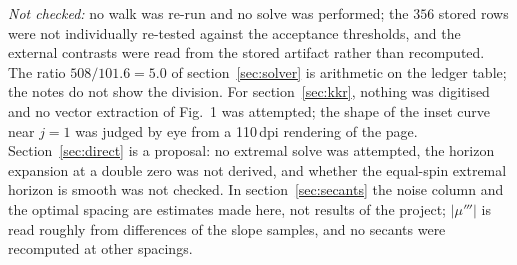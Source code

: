 \documentclass[11pt,a4paper]{article}
\begin{document}
\medskip
\noindent\emph{Not checked:} no walk was re-run and no solve was performed; the
$356$ stored rows were not individually re-tested against the acceptance
thresholds, and the external contrasts were read from the stored artifact
rather than recomputed. The ratio $508/101.6=5.0$ of section~\ref{sec:solver}
is arithmetic on the ledger table; the notes do not show the division.
For section~\ref{sec:kkr}, nothing was digitised and no vector extraction of
Fig.~1 was attempted; the shape of the inset curve near $j=1$ was judged by eye
from a 110\,dpi rendering of the page.
Section~\ref{sec:direct} is a proposal: no extremal solve was attempted, the
horizon expansion at a double zero was not derived, and whether the equal-spin
extremal horizon is smooth was not checked.
In section~\ref{sec:secants} the noise column and the optimal spacing are
estimates made here, not results of the project; $|\mu'''|$ is read roughly from
differences of the slope samples, and no secants were recomputed at other
spacings.
\end{document}
